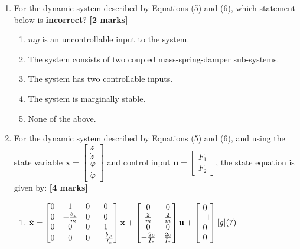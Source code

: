 \documentclass{article}
\begin{document}
\begin{enumerate}[resume]
    \item For the dynamic system described by Equations (5) and (6), which statement below is \textbf{incorrect}? \hfill \textbf{[2 marks]}
    \begin{enumerate}[label=\alph*.]
        \item $mg$ is an uncontrollable input to the system.
        \item The system consists of two coupled mass-spring-damper sub-systems.
        \item The system has two controllable inputs.
        \item The system is marginally stable.
        \item None of the above.
    \end{enumerate}

    \vspace{0.5cm}

    \item For the dynamic system described by Equations (5) and (6), and using the state variable $\mathbf{x} = \begin{bmatrix} z \\ \dot{z} \\ \varphi \\ \dot{\varphi} \end{bmatrix}$ and control input $\mathbf{u} = \begin{bmatrix} F_1 \\ F_2 \end{bmatrix}$, the state equation is given by: \hfill \textbf{[4 marks]}
    \begin{enumerate}[label=\alph*.]
    \item $\dot{\mathbf{x}} = \begin{bmatrix} 0 & 1 & 0 & 0 \\ 0 & -\frac{b_z}{m} & 0 & 0 \\ 0 & 0 & 0 & 1 \\ 0 & 0 & 0 & -\frac{b_{\varphi}}{I_z} \end{bmatrix} \mathbf{x} + \begin{bmatrix} 0 & 0 \\ \frac{2}{m} & \frac{2}{m} \\ 0 & 0 \\ -\frac{2c}{I_z} & \frac{2c}{I_z} \end{bmatrix} \mathbf{u} + \begin{bmatrix} 0 \\ -1 \\ 0 \\ 0 \end{bmatrix} [g] \hfill (7)$
    \vspace{2mm}


\end{enumerate}
\end{enumerate}
\end{document}
